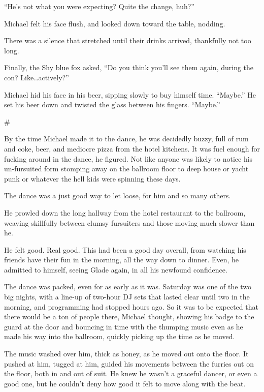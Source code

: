 \documentclass[12pt,letterpaper,oneside]{memoir}
\newcommand\secdiv{
  \begin{center}
    \#
  \end{center}
}
\begin{document}
  ``He's not what you were expecting?  Quite the change, huh?''

  Michael felt his face flush, and looked down toward the table, nodding.

  There was a silence that stretched until their drinks arrived, thankfully not too long.

  Finally, the Shy blue fox asked, ``Do you think you'll see them again, during the con?  Like\ldots{}actively?''

  Michael hid his face in his beer, sipping slowly to buy himself time.  ``Maybe.''  He set his beer down and twisted the glass between his fingers.  ``Maybe.''

  \secdiv

  By the time Michael made it to the dance, he was decidedly buzzy, full of rum and coke, beer, and mediocre pizza from the hotel kitchens.  It was fuel enough for fucking around in the dance, he figured.  Not like anyone was likely to notice his un-fursuited form stomping away on the ballroom floor to deep house or yacht punk or whatever the hell kids were spinning these days.

  The dance was a just good way to let loose, for him and so many others.

  He prowled down the long hallway from the hotel restaurant to the ballroom, weaving skillfully between clumsy fursuiters and those moving much slower than he.

  He felt good.  Real good.  This had been a good day overall, from watching his friends have their fun in the morning, all the way down to dinner.  Even, he admitted to himself, seeing Glade again, in all his newfound confidence.

  The dance was packed, even for as early as it was.  Saturday was one of the two big nights, with a line-up of two-hour DJ sets that lasted clear until two in the morning, and programming had stopped hours ago.  So it was to be expected that there would be a ton of people there, Michael thought, showing his badge to the guard at the door and bouncing in time with the thumping music even as he made his way into the ballroom, quickly picking up the time as he moved.

  The music washed over him, thick as honey, as he moved out onto the floor.  It pushed at him, tugged at him, guided his movements between the furries out on the floor, both in and out of suit.  He knew he wasn't a graceful dancer, or even a good one, but he couldn't deny how good it felt to move along with the beat.
\end{document}
